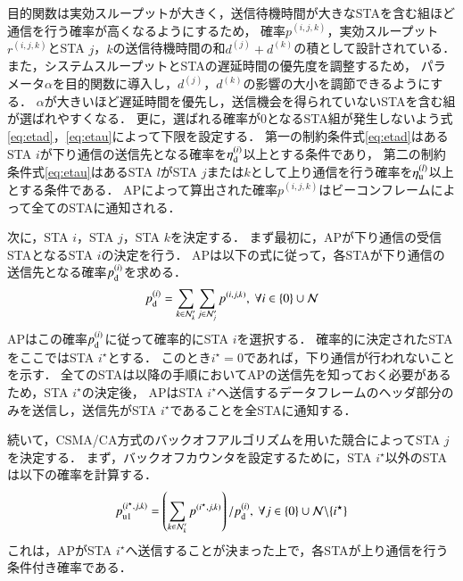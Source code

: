 \documentclass[master]{kuisthesis}		%
\newcommand{\pijk}{p^{(i,j,k)}}
\newcommand{\rijk}{r^{(i,j,k)}}
\newcommand{\mthnj}{{\mathcal N}'_j}
\newcommand{\mthnk}{{\mathcal N}'_k}
\begin{document}
			\par
			目的関数は実効スループットが大きく，送信待機時間が大きなSTAを含む組ほど通信を行う確率が高くなるようにするため，
			確率$\pijk$，実効スループット$\rijk$とSTA $j$，$k$の送信待機時間の和$d^{(j)}+d^{(k)}$の積として設計されている．
			また，システムスループットとSTAの遅延時間の優先度を調整するため，
			パラメータ$\alpha$を目的関数に導入し，$d^{(j)}$，$d^{(k)}$の影響の大小を調節できるようにする．
			$\alpha$が大きいほど遅延時間を優先し，送信機会を得られていないSTAを含む組が選ばれやすくなる．
			更に，選ばれる確率が0となるSTA組が発生しないよう式\eqref{eq:etad}，\eqref{eq:etau}によって下限を設定する．
			第一の制約条件式\eqref{eq:etad}はあるSTA $i$が下り通信の送信先となる確率を$\eta_{\rm d}^{(i)}$以上とする条件であり，
			第二の制約条件式\eqref{eq:etau}はあるSTA $l$がSTA $j$または$k$として上り通信を行う確率を$\eta_{\rm u}^{(l)}$以上とする条件である．
			APによって算出された確率$\pijk$はビーコンフレームによって全てのSTAに通知される．
			\par
			次に，STA $i$，STA $j$，STA $k$を決定する．
			まず最初に，APが下り通信の受信STAとなるSTA $i$の決定を行う．
			APは以下の式に従って，各STAが下り通信の送信先となる確率$p_{\rm d}^{(i)}$を求める．
			\begin{equation}
				p_{\rm d}^{(i)}= \sum_{k\in\mthnk}\sum_{j\in\mthnj}p^{(i,j,k)}, \ \forall i \in \{0\}\cup{\mathcal N}
			\end{equation}
			APはこの確率$p_{\rm d}^{(i)}$に従って確率的にSTA $i$を選択する．
			確率的に決定されたSTAをここではSTA $i^{\star}$とする．
			このとき$i^{\star}=0$であれば，下り通信が行われないことを示す．
			全てのSTAは以降の手順においてAPの送信先を知っておく必要があるため，STA $i^{\star}$の決定後，
			APはSTA $i^{\star}$へ送信するデータフレームのヘッダ部分のみを送信し，送信先がSTA $i^{\star}$であることを全STAに通知する．
			\par
			続いて，CSMA/CA方式のバックオフアルゴリズムを用いた競合によってSTA $j$を決定する．
			まず，バックオフカウンタを設定するために，STA $i^{\star}$以外のSTAは以下の確率を計算する．
			\begin{align}
				p_{\rm u1}^{(i^{\star},j,k)}=\left(\sum_{k\in\mthnk} p^{(i^{\star},j,k)}\right) / p_{\rm d}^{(i)},\ \forall j \in \{0\}\cup{\mathcal N}\backslash \{i^{\star}\}
			\end{align}
			これは，APがSTA $i^{\star}$へ送信することが決まった上で，各STAが上り通信を行う条件付き確率である．
\end{document}
